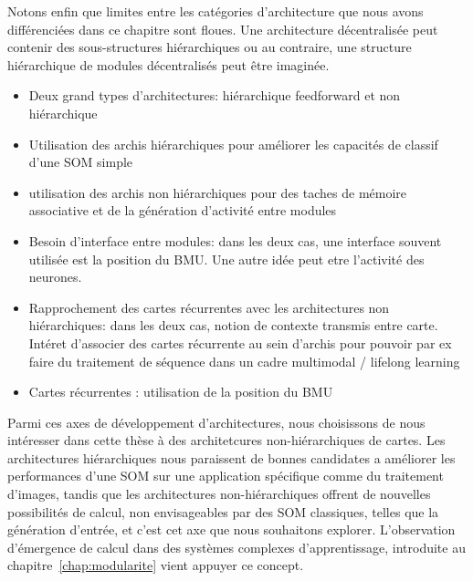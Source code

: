 \documentclass[../main]{subfiles}
\begin{document}
Notons enfin que limites entre les catégories d'architecture que nous avons différenciées dans ce chapitre sont floues. Une architecture décentralisée peut contenir des sous-structures hiérarchiques ou au contraire, une structure hiérarchique de modules décentralisés peut être imaginée.


\begin{itemize}
    \item Deux grand types d'architectures: hiérarchique feedforward et non hiérarchique
    \item Utilisation des archis hiérarchiques pour améliorer les capacités de classif d'une SOM simple
    \item utilisation des archis non hiérarchiques pour des taches de mémoire associative et de la génération d'activité entre modules
    \item Besoin d'interface entre modules: dans les deux cas, une interface souvent utilisée est la position du BMU. Une autre idée peut etre l'activité des neurones.
    \item Rapprochement des cartes récurrentes avec les architectures non hiérarchiques: dans les deux cas, notion de contexte transmis entre carte. Intéret d'associer des cartes récurrente au sein d'archis pour pouvoir par ex faire du traitement de séquence dans un cadre multimodal / lifelong learning
    \item Cartes récurrentes : utilisation de la position du BMU
\end{itemize}

Parmi ces axes de développement d'architectures, nous choisissons de nous intéresser dans cette thèse à des architetcures non-hiérarchiques de cartes.
Les architectures hiérarchiques nous paraissent de bonnes candidates a améliorer les performances d'une SOM sur une application spécifique comme du traitement d'images, tandis que les architectures non-hiérarchiques offrent de nouvelles possibilités de calcul, non envisageables par des SOM classiques, telles que la génération d'entrée, et c'est cet axe que nous souhaitons explorer. L'observation d'émergence de calcul dans des systèmes complexes d'apprentissage, introduite au chapitre~\ref{chap:modularite} vient appuyer ce concept.
\end{document}
